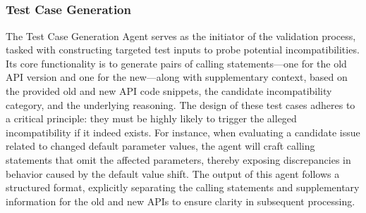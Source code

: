 

\subsection{}



\subsubsection{Test Case Generation}

The Test Case Generation Agent serves as the initiator of the validation process, tasked with constructing targeted test inputs to probe potential incompatibilities. Its core functionality is to generate pairs of calling statements—one for the old API version and one for the new—along with supplementary context, based on the provided old and new API code snippets, the candidate incompatibility category, and the underlying reasoning. The design of these test cases adheres to a critical principle: they must be highly likely to trigger the alleged incompatibility if it indeed exists. For instance, when evaluating a candidate issue related to changed default parameter values, the agent will craft calling statements that omit the affected parameters, thereby exposing discrepancies in behavior caused by the default value shift. The output of this agent follows a structured format, explicitly separating the calling statements and supplementary information for the old and new APIs to ensure clarity in subsequent processing.

